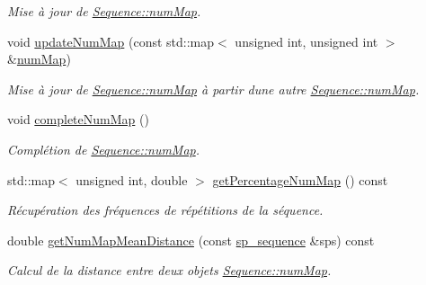 \begin{DoxyCompactItemize}
\begin{DoxyCompactList}\small\item\em Mise à jour de \hyperlink{class_sequence_a3fb6b6543259ea07c976012dd622cdcc}{Sequence\+::num\+Map}. \end{DoxyCompactList}\item 
void \hyperlink{class_sequence_a03ef5cb5c25d9a9de0f5c61d786580bb}{update\+Num\+Map} (const std\+::map$<$ unsigned int, unsigned int $>$ \&\hyperlink{class_sequence_a3fb6b6543259ea07c976012dd622cdcc}{num\+Map})
\begin{DoxyCompactList}\small\item\em Mise à jour de \hyperlink{class_sequence_a3fb6b6543259ea07c976012dd622cdcc}{Sequence\+::num\+Map} à partir d\textquotesingle{}une autre \hyperlink{class_sequence_a3fb6b6543259ea07c976012dd622cdcc}{Sequence\+::num\+Map}. \end{DoxyCompactList}\item 
void \hyperlink{class_sequence_a2069ef17dde51540555a4aada06977fb}{complete\+Num\+Map} ()
\begin{DoxyCompactList}\small\item\em Complétion de \hyperlink{class_sequence_a3fb6b6543259ea07c976012dd622cdcc}{Sequence\+::num\+Map}. \end{DoxyCompactList}\item 
std\+::map$<$ unsigned int, double $>$ \hyperlink{class_sequence_aa2f856b4cbc1aa775824144caa4d47e3}{get\+Percentage\+Num\+Map} () const 
\begin{DoxyCompactList}\small\item\em Récupération des fréquences de répétitions de la séquence. \end{DoxyCompactList}\item 
double \hyperlink{class_sequence_aa619292ed4984e6f7f4f3010caa55d16}{get\+Num\+Map\+Mean\+Distance} (const \hyperlink{class_sequence_a796bfa70aa4ddd4e447c210655b5dc5a}{sp\+\_\+sequence} \&sps) const 
\begin{DoxyCompactList}\small\item\em Calcul de la distance entre deux objets \hyperlink{class_sequence_a3fb6b6543259ea07c976012dd622cdcc}{Sequence\+::num\+Map}. \end{DoxyCompactList}\end{DoxyCompactItemize}
